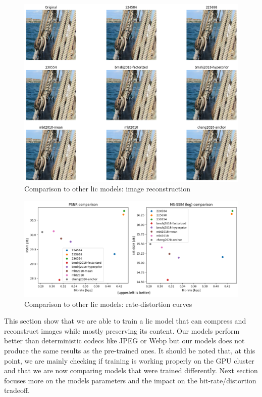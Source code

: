 \begin{figure}
    \centering
    \includegraphics[width=15cm]{img/balle_repro_5.png}
    \caption{Comparison to other \acrshort{lic} models: image reconstruction}
    \label{balle_repro_5}
\end{figure}

\begin{figure}
    \centering
    \includegraphics[width=15cm]{img/balle_repro_6.png}
    \caption{Comparison to other \acrshort{lic} models: rate-distortion curves}
    \label{balle_repro_6}
\end{figure}

This section show that we are able to train a \acrshort{lic} model that can compress and reconstruct images while mostly preserving its content. Our models perform better than deterministic codecs like JPEG or Webp but our models does not produce the same results as the pre-trained ones. It should be noted that, at this point, we are mainly checking if training is working properly on the GPU cluster and that we are now comparing models that were trained differently. Next section focuses more on the models parameters and the impact on the bit-rate/distortion tradeoff.


